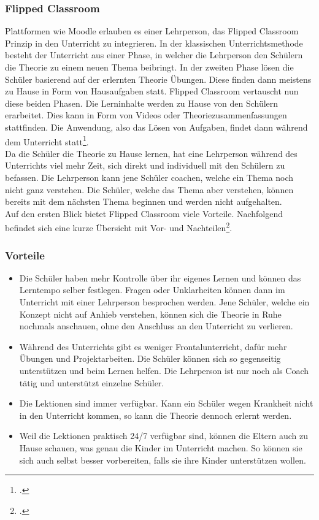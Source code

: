 \subsubsection{Flipped Classroom}
Plattformen wie Moodle erlauben es einer Lehrperson, das Flipped Classroom Prinzip in den Unterricht zu integrieren. In der klassischen Unterrichtsmethode besteht der Unterricht aus einer Phase, in welcher die Lehrperson den Schülern die Theorie zu einem neuen Thema beibringt. In der zweiten Phase lösen die Schüler basierend auf der erlernten Theorie Übungen. Diese finden dann meistens zu Hause in Form von Hausaufgaben statt. Flipped Classroom vertauscht nun diese beiden Phasen. Die Lerninhalte werden zu Hause von den Schülern erarbeitet. Dies kann in Form von Videos oder Theoriezusammenfassungen stattfinden. Die Anwendung, also das Lösen von Aufgaben, findet dann während dem Unterricht statt\footcite{flipped_classroom_theorie}. \\

Da die Schüler die Theorie zu Hause lernen, hat eine Lehrperson während des Unterrichts viel mehr Zeit, sich direkt und individuell mit den Schülern zu befassen. Die Lehrperson kann jene Schüler coachen, welche ein Thema noch nicht ganz verstehen. Die Schüler, welche das Thema aber verstehen, können bereits mit dem nächsten Thema beginnen und werden nicht aufgehalten. \\

Auf den ersten Blick bietet Flipped Classroom viele Vorteile. Nachfolgend befindet sich eine kurze Übersicht mit Vor- und Nachteilen\footcite{flipped_classroom_pro_con}.

\newpage
\subsubsection*{Vorteile}
\begin{itemize}
	\item Die Schüler haben mehr Kontrolle über ihr eigenes Lernen und können das Lerntempo selber festlegen. Fragen oder Unklarheiten können dann im Unterricht mit einer Lehrperson besprochen werden. Jene Schüler, welche ein Konzept nicht auf Anhieb verstehen, können sich die Theorie in Ruhe nochmals anschauen, ohne den Anschluss an den Unterricht zu verlieren.
	\item Während des Unterrichts gibt es weniger Frontalunterricht, dafür mehr Übungen und Projektarbeiten. Die Schüler können sich so gegenseitig unterstützen und beim Lernen helfen. Die Lehrperson ist nur noch als Coach tätig und unterstützt einzelne Schüler.
	\item Die Lektionen sind immer verfügbar. Kann ein Schüler wegen Krankheit nicht in den Unterricht kommen, so kann die Theorie dennoch erlernt werden. 
	\item Weil die Lektionen praktisch 24/7 verfügbar sind, können die Eltern auch zu Hause schauen, was genau die Kinder im Unterricht machen. So können sie sich auch selbst besser vorbereiten, falls sie ihre Kinder unterstützen wollen. 
\end{itemize}

